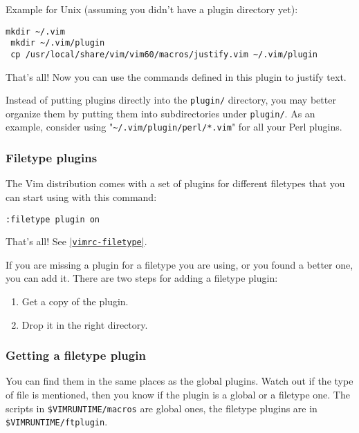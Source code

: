 Example for Unix (assuming you didn't have a plugin directory yet):

 \begin{Verbatim}[samepage=true]
 mkdir ~/.vim
 mkdir ~/.vim/plugin
 cp /usr/local/share/vim/vim60/macros/justify.vim ~/.vim/plugin
 \end{Verbatim}

That's all!
Now you can use the commands defined in this plugin to justify text.

Instead of putting plugins directly into the \verb!plugin/! directory, you may better organize them by putting them into subdirectories under \verb!plugin/!.
As an example, consider using "\verb!~/.vim/plugin/perl/*.vim!" for all your Perl plugins.

\subsubsection{Filetype plugins}
\label{add-filetype-plugin}
\label{ftplugin}

The Vim distribution comes with a set of plugins for different filetypes that you can start using with this command:

 \begin{Verbatim}[samepage=true]
 :filetype plugin on
 \end{Verbatim}

That's all!
See \hyperref[vimrc-filetype]{|\texttt{vimrc-filetype}|}.

If you are missing a plugin for a filetype you are using, or you found a better one, you can add it.
There are two steps for adding a filetype plugin:

\begin{enumerate}
				\item Get a copy of the plugin.
				\item Drop it in the right directory.
\end{enumerate}

\subsubsection{Getting a filetype plugin}

You can find them in the same places as the global plugins.
Watch out if the type of file is mentioned, then you know if the plugin is a global or a filetype one.
The scripts in \verb!$VIMRUNTIME/macros! are global ones, the filetype plugins are in \verb!$VIMRUNTIME/ftplugin!.

